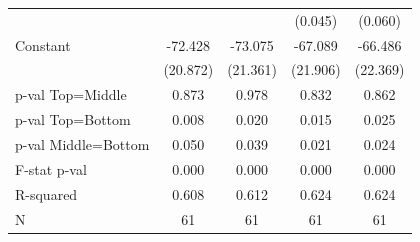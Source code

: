 \begin{tabular}{l*{4}{c}}
                    &            &            &     (0.045)&     (0.060)\\
\addlinespace
Constant            &     -72.428&     -73.075&     -67.089&     -66.486\\
                    &    (20.872)&    (21.361)&    (21.906)&    (22.369)\\
\midrule
p-val Top=Middle    &       0.873&       0.978&       0.832&       0.862\\
p-val Top=Bottom    &       0.008&       0.020&       0.015&       0.025\\
p-val Middle=Bottom &       0.050&       0.039&       0.021&       0.024\\
F-stat p-val        &       0.000&       0.000&       0.000&       0.000\\
R-squared           &       0.608&       0.612&       0.624&       0.624\\
N                   &          61&          61&          61&          61\\
\bottomrule
\end{tabular}

